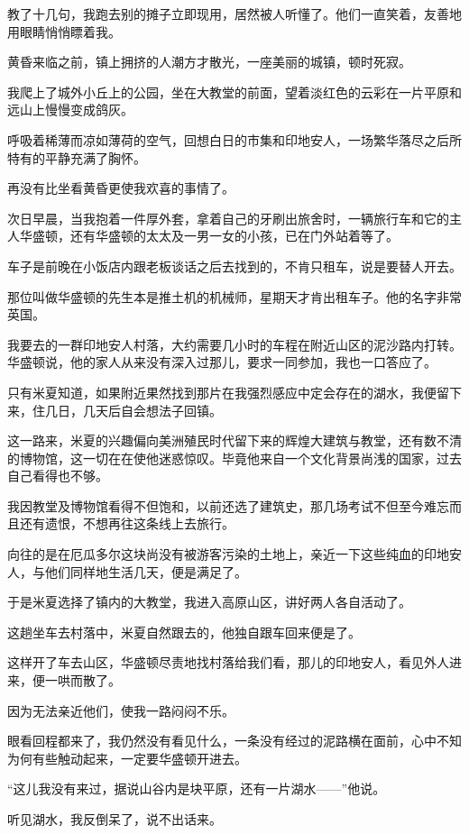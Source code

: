 \par 教了十几句，我跑去别的摊子立即现用，居然被人听懂了。他们一直笑着，友善地用眼睛悄悄瞟着我。
\par 黄昏来临之前，镇上拥挤的人潮方才散光，一座美丽的城镇，顿时死寂。
\par 我爬上了城外小丘上的公园，坐在大教堂的前面，望着淡红色的云彩在一片平原和远山上慢慢变成鸽灰。
\par 呼吸着稀薄而凉如薄荷的空气，回想白日的市集和印地安人，一场繁华落尽之后所特有的平静充满了胸怀。
\par 再没有比坐看黄昏更使我欢喜的事情了。
\par 次日早晨，当我抱着一件厚外套，拿着自己的牙刷出旅舍时，一辆旅行车和它的主人华盛顿，还有华盛顿的太太及一男一女的小孩，已在门外站着等了。
\par 车子是前晚在小饭店内跟老板谈话之后去找到的，不肯只租车，说是要替人开去。
\par 那位叫做华盛顿的先生本是推土机的机械师，星期天才肯出租车子。他的名字非常英国。
\par 我要去的一群印地安人村落，大约需要几小时的车程在附近山区的泥沙路内打转。华盛顿说，他的家人从来没有深入过那儿，要求一同参加，我也一口答应了。
\par 只有米夏知道，如果附近果然找到那片在我强烈感应中定会存在的湖水，我便留下来，住几日，几天后自会想法子回镇。
\par 这一路来，米夏的兴趣偏向美洲殖民时代留下来的辉煌大建筑与教堂，还有数不清的博物馆，这一切在在使他迷惑惊叹。毕竟他来自一个文化背景尚浅的国家，过去自己看得也不够。
\par 我因教堂及博物馆看得不但饱和，以前还选了建筑史，那几场考试不但至今难忘而且还有遗恨，不想再往这条线上去旅行。
\par 向往的是在厄瓜多尔这块尚没有被游客污染的土地上，亲近一下这些纯血的印地安人，与他们同样地生活几天，便是满足了。
\par 于是米夏选择了镇内的大教堂，我进入高原山区，讲好两人各自活动了。
\par 这趟坐车去村落中，米夏自然跟去的，他独自跟车回来便是了。
\par 这样开了车去山区，华盛顿尽责地找村落给我们看，那儿的印地安人，看见外人进来，便一哄而散了。
\par 因为无法亲近他们，使我一路闷闷不乐。
\par 眼看回程都来了，我仍然没有看见什么，一条没有经过的泥路横在面前，心中不知为何有些触动起来，一定要华盛顿开进去。
\par “这儿我没有来过，据说山谷内是块平原，还有一片湖水——”他说。
\par 听见湖水，我反倒呆了，说不出话来。
